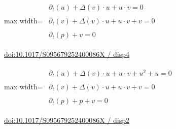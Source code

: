 \documentclass[10pt,a4paper]{article}
\begin{document}
\begin{minipage}{\linewidth}
\begin{center}\begin{adjustbox}{max width=\linewidth}$\displaystyle\begin{gathered}\begin{gathered}\partial_{t}(u)+\Delta(v)\cdot u+u\cdot v=0\end{gathered}\\[5pt]\begin{gathered}\partial_{t}(v)+\Delta(v)\cdot u+u\cdot v+v=0\end{gathered}\\[5pt]\begin{gathered}\partial_{t}(p)+v=0\end{gathered}\end{gathered}$\end{adjustbox}\end{center}
{\small \href{https://www.cambridge.org/core/journals/european-journal-of-applied-mathematics/article/spatiotemporal-behaviour-of-sir-models-with-crossdiffusion-and-vital-dynamics/F33014FE3C7FC7F75F5608E66030C421#disp4}{doi:10.1017/S095679252400086X / disp4}}\par
\end{minipage}\par\vspace{7mm}

\begin{minipage}{\linewidth}
\begin{center}\begin{adjustbox}{max width=\linewidth}$\displaystyle\begin{gathered}\begin{gathered}\partial_{t}(u)+\Delta(v)\cdot u+u\cdot v+u^{2}+u=0\end{gathered}\\[5pt]\begin{gathered}\partial_{t}(v)+\Delta(v)\cdot u+u\cdot v+v=0\end{gathered}\\[5pt]\begin{gathered}\partial_{t}(p)+p+v=0\end{gathered}\end{gathered}$\end{adjustbox}\end{center}
{\small \href{https://www.cambridge.org/core/journals/european-journal-of-applied-mathematics/article/spatiotemporal-behaviour-of-sir-models-with-crossdiffusion-and-vital-dynamics/F33014FE3C7FC7F75F5608E66030C421#disp2}{doi:10.1017/S095679252400086X / disp2}}\par
\end{minipage}\par\vspace{7mm}
\end{document}
